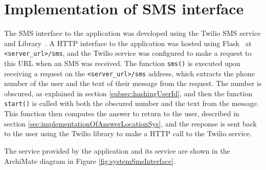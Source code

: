 \documentclass[authoryearcitations]{UoYCSproject}
\begin{document}
\section{Implementation of SMS interface}
\label{sec:implSms}
The SMS interface to the application was developed using the Twilio SMS service and Library~\cite{serviceTwilio, libraryTwilio}. A HTTP interface to the application was hosted using Flask~\cite{libraryFlask} at \texttt{<server\_url>/sms}, and the Twilio service was configured to make a request to this URL when an SMS was received. The function \texttt{sms()} is executed upon receiving a request on the \texttt{<server\_url>/sms} address, which extracts the phone number of the user and the text of their message from the request. The number is obscured, as explained in section \ref{subsec:hashingUserId}, and then the function \texttt{start()} is called with both the obscured number and the text from the message. This function then computes the answer to return to the user, described in section \ref{sec:implementationOfAnswerLocationSys}, and the response is sent back to the user using the Twilio library to make a HTTP call to the Twilio service.

The service provided by the application and its service are shown in the ArchiMate diagram in Figure \ref{fig:systemSmsInterface}.
\end{document}
